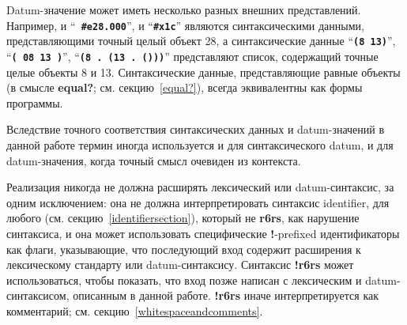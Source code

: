 Datum-значение может иметь несколько разных внешних представлений. Например, и ``{\tt\bfseries
  \#e28.000}'', и ``{\tt\bfseries\#x1c}'' являются синтаксическими данными, представляющими
точный целый объект 28, а синтаксические данные ``{\tt\bfseries(8 13)}'', ``{\tt\bfseries( 08 13
  )}'', ``{\tt\bfseries(8 .\ (13 .\ ()))}'' представляют список, содержащий точные целые
объекты 8 и 13. Синтаксические данные, представляющие равные объекты (в смысле {\cf\bfseries
  equal?}; см. секцию~\ref{equal?}), всегда эквивалентны как формы программы.

Вследствие точного соответствия синтаксических данных и datum-значений в данной работе термин
 иногда используется и для синтаксического datum, и для datum-значения, когда
точный смысл очевиден из контекста.

Реализация никогда не должна расширять лексический или datum-синтаксис, за
одним исключением: она не должна интерпретировать синтаксис {\cf{\bfseries \sharpsign{}!}\meta
  {identifier}}, для любого  (см. секцию~\ref {identifiersection}),
который не {\cf\bfseries r6rs}, как нарушение синтаксиса, и она может использовать специфические
{\cf\bfseries \sharpsign {}!}-prefixed идентификаторы как флаги, указывающие, что последующий
вход содержит расширения к лексическому стандарту или datum-синтаксису. Синтаксис {\cf \sharpsign
\bfseries{}!r6rs} может использоваться, чтобы показать, что вход позже написан с лексическим и
datum-синтаксисом, описанным в данной работе. {\cf \sharpsign\bfseries {}!r6rs} иначе интерпретируется
как комментарий; см. секцию~\ref {whitespaceandcomments}.

